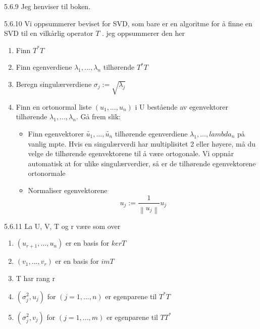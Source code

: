\documentclass[a4paper,norsk]{article}
\begin{document}
\begin{proofbox}{5.6.9}{}
Jeg henviser til boken.
\end{proofbox}

\begin{algoritme}{5.6.10}
    Vi oppsummerer beviset for SVD, som bare er en algoritme for å finne en SVD til en vilkårlig operator $ T $ . jeg oppsummerer den her

\begin{enumerate}
    \item Finn $ T^*T $ 
    \item Finn egenverdiene $ \lambda _1, ..., \lambda _n $ tilhørende $ T^*T $ 
    \item Beregn singulærverdiene $ \sigma_j := \sqrt{ \lambda _j } $ 
    \item Finn en ortonormal liste $ \left( u_1, ..., u_n \right)  $ i U bestående av egenvektorer tilhørende $ \lambda _1, ..., \lambda _n $. Gå frem slik:
    \begin{itemize}
        \item Finn egenvektorer $ \tilde{u_1}, ..., \tilde{u_n} $ tilhørende egenverdiene $ \lambda _1, ..., lambda_n $ på vanlig mpte. Hvis en singulærverdi har multiplisitet 2 eller høyere, må du velge de tilhørende egenvektorene til å være ortogonale. Vi oppnår automatisk at for ulike singulærverdier, så er de tilhørende egenvektorene ortonormale
        \item Normaliser egenvektorene
        \[
            u_j := \frac{ 1 }{ \left\lVert u_j \right\rVert }u_j
        \]
        
    \end{itemize}
\end{enumerate}
\end{algoritme}

\begin{corollarybox}{5.6.11}{}
La U, V, T og r være som over

\begin{enumerate}
    \item $ \left( u_{r+1}, ..., u_n \right)  $ er en basis for $ kerT $ 
    \item $ \left( v_1, ..., v_r \right)  $ er en basis for $ imT $ 
    \item T har rang r
    \item $ \left( \sigma_j^2, u_j \right)  $ for $ \left( j=1, ..., n \right)  $ er egenparene til $ T^*T $ 
    \item $ \left( \sigma_j^2, v_j \right)  $ for $ \left( j=1, ..., m \right)  $ er egenparene til $ TT^* $ 
\end{enumerate}
\end{corollarybox}
\end{document}

